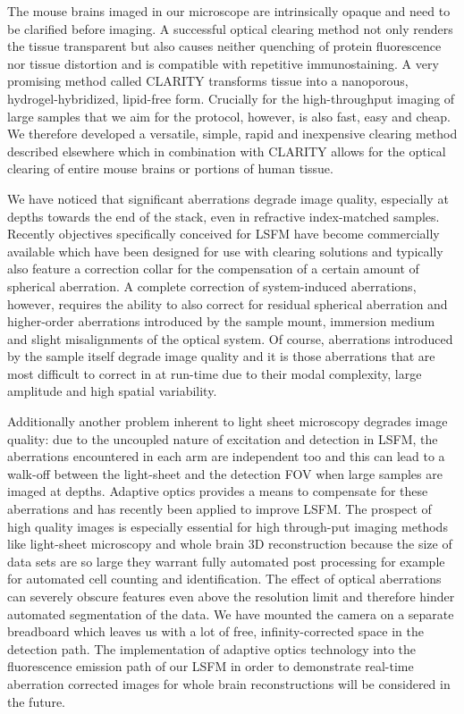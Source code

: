 \documentclass[12pt]{spieman}  %
\begin{document}
The mouse brains imaged in our microscope are intrinsically opaque and need to be clarified before imaging. A successful optical clearing method not only renders the tissue transparent but also causes neither quenching of protein fluorescence nor tissue distortion and is compatible with repetitive immunostaining. A very promising method called CLARITY\cite{Chung2013,Tomer2014} transforms tissue into a nanoporous, hydrogel-hybridized, lipid-free form. Crucially for the high-throughput imaging of large samples that we aim for the protocol, however, is also fast, easy and cheap. We therefore developed a versatile, simple, rapid and inexpensive clearing method described elsewhere\cite{Costantini} which in combination with CLARITY allows for the optical clearing of entire mouse brains or portions of human tissue.

We have noticed that significant aberrations degrade image quality, especially at depths towards the end of the stack, even in refractive index-matched samples. Recently objectives specifically conceived for LSFM have become commercially available\cite{Marx2014} which have been designed for use with clearing solutions and typically also feature a correction collar for the compensation of a certain amount of spherical aberration. A complete correction of system-induced aberrations, however, requires the ability to also correct for residual spherical aberration and higher-order aberrations introduced by the sample mount, immersion medium and slight misalignments of the optical system. Of course, aberrations introduced by the sample itself degrade image quality and it is those aberrations that are most difficult to correct in at run-time due to their modal complexity, large amplitude and high spatial variability\cite{Wang2014}. 

Additionally another problem inherent to light sheet microscopy degrades image quality: due to the uncoupled nature of excitation and detection in LSFM, the aberrations encountered in each arm are independent too and this can lead to a walk-off between the light-sheet and the detection FOV when large samples are imaged at depths. Adaptive optics\cite{Booth2007} provides a means to compensate for these aberrations and has recently been applied to improve LSFM\cite{Jorand2012,Wang2014}. The prospect of high quality images is especially essential for high through-put imaging methods like light-sheet microscopy and whole brain 3D reconstruction because the size of data sets are so large they warrant fully automated post processing for example for automated cell counting and identification\cite{Frasconi2014}. The effect of optical aberrations can severely obscure features even above the resolution limit and therefore hinder automated segmentation of the data. We have mounted the camera on a separate breadboard which leaves us with a lot of free, infinity-corrected space in the detection path. The implementation of adaptive optics technology into the fluorescence emission path of our LSFM in order to demonstrate real-time aberration corrected images for whole brain reconstructions will be considered in the future. 
\end{document}
